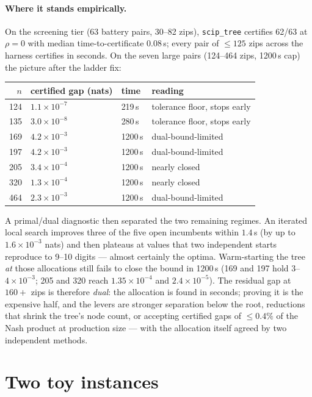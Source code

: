 \documentclass[11pt]{article}
\theoremstyle{definition}
\begin{document}
\paragraph{Where it stands empirically.}
On the screening tier (63 battery pairs, 30--82 zips), \texttt{scip\_tree} certifies
62/63 at $\rho=0$ with median time-to-certificate $0.08$\,s; every pair of ${\le}125$
zips across the harness certifies in seconds. On the seven large pairs (124--464 zips,
1200\,s cap) the picture after the ladder fix:

\begin{center}
\begin{tabular}{rlll}
\toprule
$n$ & certified gap (nats) & time & reading\\
\midrule
124 & $1.1\times10^{-7}$ & 219\,s & tolerance floor, stops early\\
135 & $3.0\times10^{-8}$ & 280\,s & tolerance floor, stops early\\
169 & $4.2\times10^{-3}$ & 1200\,s & dual-bound-limited\\
197 & $4.2\times10^{-3}$ & 1200\,s & dual-bound-limited\\
205 & $3.4\times10^{-4}$ & 1200\,s & nearly closed\\
320 & $1.3\times10^{-4}$ & 1200\,s & nearly closed\\
464 & $2.3\times10^{-3}$ & 1200\,s & dual-bound-limited\\
\bottomrule
\end{tabular}
\end{center}

A primal/dual diagnostic then separated the two remaining regimes. An iterated local
search improves three of the five open incumbents within $1.4$\,s (by up to
$1.6\times10^{-3}$ nats) and then plateaus at values that two independent starts
reproduce to 9--10 digits --- almost certainly the optima. Warm-starting the tree
\emph{at} those allocations still fails to close the bound in 1200\,s (169 and 197 hold
$3$--$4\times10^{-3}$; 205 and 320 reach $1.35\times10^{-4}$ and $2.4\times10^{-5}$).
The residual gap at $160{+}$ zips is therefore \emph{dual}: the allocation is found in
seconds; proving it is the expensive half, and the levers are stronger separation below
the root, reductions that shrink the tree's node count, or accepting certified gaps of
${\le}0.4\%$ of the Nash product at production size --- with the allocation itself
agreed by two independent methods.

\section{Two toy instances}\label{sec:toys}
\end{document}
